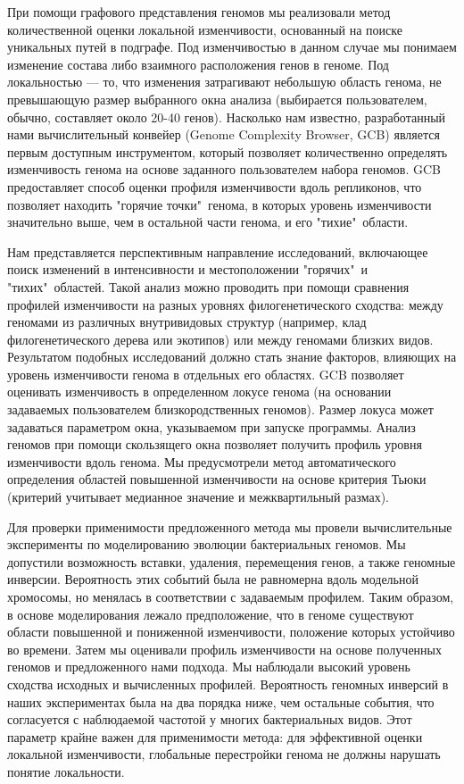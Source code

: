 При помощи графового представления геномов мы реализовали метод количественной оценки локальной изменчивости, основанный на поиске уникальных путей в подграфе. Под изменчивостью в данном случае мы понимаем изменение состава либо взаимного расположения генов в геноме. Под локальностью --- то, что изменения затрагивают небольшую область генома, не превышающую размер выбранного окна анализа (выбирается пользователем, обычно, составляет около 20-40 генов). Насколько нам известно, разработанный нами вычислительный конвейер (Genome Complexity Browser, GCB) является первым доступным инструментом, который позволяет количественно определять изменчивость генома на основе заданного пользователем набора геномов. GCB предоставляет способ оценки профиля изменчивости вдоль репликонов, что позволяет находить "горячие точки"\ генома, в которых уровень изменчивости значительно выше, чем в остальной части генома, и его "тихие"\ области. 

Нам представляется перспективным направление исследований, включающее поиск изменений в интенсивности и местоположении "горячих"\ и "тихих"\ областей. Такой анализ можно проводить при помощи сравнения профилей изменчивости на разных уровнях филогенетического сходства: между геномами из различных внутривидовых структур (например, клад филогенетического дерева или экотипов) или между геномами близких видов. Результатом подобных исследований должно стать знание факторов, влияющих на уровень изменчивости генома в отдельных его областях. GCB позволяет оценивать изменчивость в определенном локусе генома (на основании задаваемых пользователем близкородственных геномов). Размер локуса может задаваться параметром окна, указываемом при запуске программы. Анализ геномов при помощи скользящего окна позволяет получить профиль уровня изменчивости вдоль генома. Мы предусмотрели метод автоматического определения областей повышенной изменчивости на основе критерия Тьюки (критерий учитывает медианное значение и межквартильный размах).

Для проверки применимости предложенного метода мы провели вычислительные эксперименты по моделированию эволюции бактериальных геномов. Мы допустили возможность вставки, удаления, перемещения генов, а также геномные инверсии. Вероятность этих событий была не равномерна вдоль модельной хромосомы, но менялась в соответствии с задаваемым профилем. Таким образом, в основе моделирования лежало предположение, что в геноме существуют области повышенной и пониженной изменчивости, положение которых устойчиво во времени. Затем мы оценивали профиль изменчивости на основе полученных геномов и предложенного нами подхода. Мы наблюдали высокий уровень сходства исходных и вычисленных профилей. Вероятность геномных инверсий в наших экспериментах была на два порядка ниже, чем остальные события, что согласуется с наблюдаемой частотой у многих бактериальных видов. Этот параметр крайне важен для применимости метода: для эффективной оценки локальной изменчивости, глобальные перестройки генома не должны нарушать понятие локальности. 

